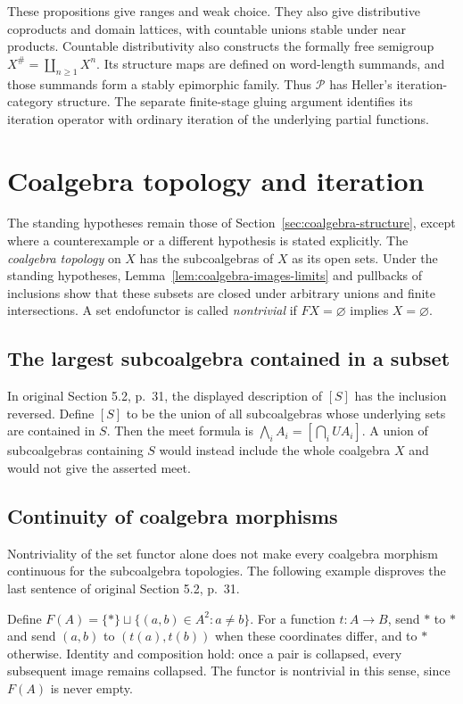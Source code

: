 \documentclass[11pt]{article}
\begin{document}
These propositions give ranges and weak choice. They also give distributive coproducts and domain lattices, with countable unions stable under near products. Countable distributivity also constructs the formally free semigroup $X^\#=\coprod_{n\geq1}X^n$. Its structure maps are defined on word-length summands, and those summands form a stably epimorphic family. Thus $\mathcal P$ has Heller's iteration-category structure. The separate finite-stage gluing argument identifies its iteration operator with ordinary iteration of the underlying partial functions.

\section{Coalgebra topology and iteration}\label{sec:coalgebra-iteration}
The standing hypotheses remain those of Section~\ref{sec:coalgebra-structure}, except where a counterexample or a different hypothesis is stated explicitly. The \emph{coalgebra topology} on $X$ has the subcoalgebras of $X$ as its open sets. Under the standing hypotheses, Lemma~\ref{lem:coalgebra-images-limits} and pullbacks of inclusions show that these subsets are closed under arbitrary unions and finite intersections. A set endofunctor is called \emph{nontrivial} if $FX=\varnothing$ implies $X=\varnothing$.

\subsection{The largest subcoalgebra contained in a subset}
In original Section 5.2, p.~31, the displayed description of $[S]$ has the inclusion reversed. Define $[S]$ to be the union of all subcoalgebras whose underlying sets are contained in $S$. Then the meet formula is $\bigwedge_i A_i=[\bigcap_i UA_i]$. A union of subcoalgebras containing $S$ would instead include the whole coalgebra $X$ and would not give the asserted meet.

\subsection{Continuity of coalgebra morphisms}
Nontriviality of the set functor alone does not make every coalgebra morphism continuous for the subcoalgebra topologies. The following example disproves the last sentence of original Section 5.2, p.~31.

Define $F(A)=\{*\}\sqcup\{(a,b)\in A^2:a\ne b\}$. For a function $t:A\to B$, send $*$ to $*$ and send $(a,b)$ to $(t(a),t(b))$ when these coordinates differ, and to $*$ otherwise. Identity and composition hold: once a pair is collapsed, every subsequent image remains collapsed. The functor is nontrivial in this sense, since $F(A)$ is never empty.
\end{document}
